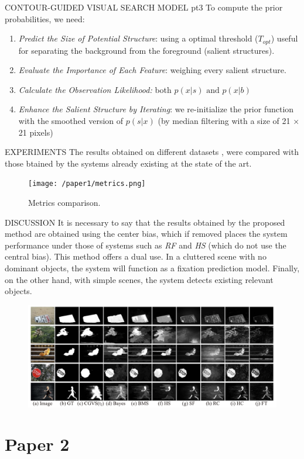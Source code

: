 \documentclass[10pt]{beamer}
\begin{document}
\begin{frame}{CONTOUR-GUIDED VISUAL SEARCH MODEL pt3}
    To compute the prior probabilities, we need:
    \begin{enumerate}
        \item \emph{Predict the Size of Potential Structure}: using a optimal threshold ($ T_{opt} $) 
        useful for separating the background from the foreground (salient structures).
        \item \emph{Evaluate the Importance of Each Feature}: weighing every salient structure.
        \item \emph{Calculate the Observation Likelihood:} both $ p(x|s) \mbox{ and } p(x|b) $
        \item \emph{Enhance the Salient Structure by Iterating}: we re-initialize the prior 
        function with the smoothed version of $ p(s|x) $ (by median filtering 
        with a size of 21 × 21 pixels)
    \end{enumerate}
\end{frame}

\begin{frame}[t]{EXPERIMENTS}
    The results obtained on different datasets , were compared with those 
    btained by the systems already existing at the state of the art.
    \begin{figure}[htbp]
        \centering
        \texttt{[image: /paper1/metrics.png]}
        \centering
        \caption{Metrics comparison.}
        \label{fig: metrics}
    \end{figure}
\end{frame}

\begin{frame}{DISCUSSION}
    It is necessary to say that the results obtained by the proposed method 
    are obtained using the center bias, which if removed places the system 
    performance under those of systems such as \emph{RF}  and \emph{HS} (which do not 
    use the central bias). This method offers a dual use. In 
    a cluttered scene with no dominant objects, the system will function as a 
    fixation prediction model. Finally, on the other hand, with simple scenes, 
    the system detects existing relevant objects.
    \begin{figure}[htbp]
        \centering
        \includegraphics[width = 0.7 \linewidth]{paper1/SystemsComp.png}
        \centering
        \label{fig: metrics}
    \end{figure}
\end{frame}

\section{Paper 2}
\begin{frame}
    
\end{frame}




    
\end{document}

